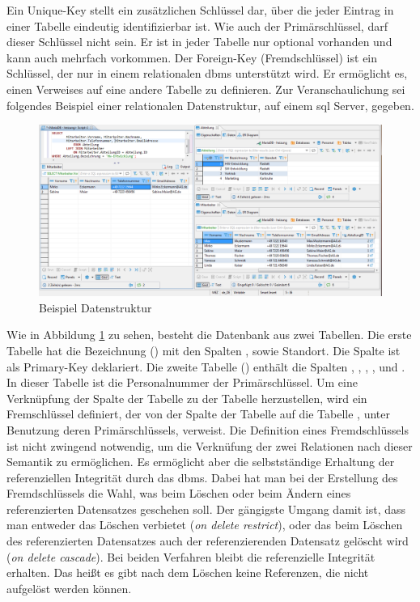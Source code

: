 Ein Unique-Key stellt ein zusätzlichen Schlüssel dar, über die jeder Eintrag in einer Tabelle eindeutig identifizierbar ist.
Wie auch der Primärschlüssel, darf dieser Schlüssel nicht  sein.
Er ist in jeder Tabelle nur optional vorhanden und kann auch mehrfach vorkommen.
Der Foreign-Key (Fremdschlüssel) ist ein Schlüssel, der nur in einem relationalen \ac{dbms} unterstützt wird.
Er ermöglicht es, einen Verweises auf eine andere Tabelle zu definieren.
Zur Veranschaulichung sei folgendes Beispiel einer relationalen Datenstruktur,
auf einem \ac{sql} Server, gegeben.
\begin{figure}[hbt]
  \centering
  \includegraphics[width=\textwidth]{content/hauptteil/theoretischeGrundlagen/rec/exampleSQL.png}
\caption{Beispiel Datenstruktur}
 \label{fig:exampleSQLStructure}%
\end{figure}
Wie in Abbildung \ref{fig:exampleSQLStructure} zu sehen, besteht die Datenbank  aus zwei Tabellen.
Die erste Tabelle hat die Bezeichnung () mit den Spalten ,  sowie Standort.
Die Spalte  ist als Primary-Key deklariert.
Die zweite Tabelle () enthält die Spalten 
, , , ,  und .
In dieser Tabelle ist die Personalnummer der Primärschlüssel.
Um eine Verknüpfung der Spalte  der Tabelle  zu der Tabelle  herzustellen, 
wird ein Fremschlüssel definiert, der von der Spalte  der Tabelle  auf die Tabelle , 
unter Benutzung deren Primärschlüssels, verweist.
Die Definition eines Fremdschlüssels ist nicht zwingend notwendig, um die Verknüfung der zwei Relationen nach dieser Semantik zu ermöglichen.
Es ermöglicht aber die selbstständige Erhaltung der referenziellen In­te­g­ri­tät durch das \ac{dbms}. 
Dabei hat man bei der Erstellung des Fremdschlüssels die Wahl, was beim Löschen oder beim Ändern eines referenzierten Datensatzes geschehen soll.
Der gängigste Umgang damit ist, dass man entweder das Löschen verbietet (\emph{on delete restrict}),
oder das beim Löschen des referenzierten Datensatzes auch der referenzierenden Datensatz gelöscht wird (\emph{on delete cascade}).
Bei beiden Verfahren bleibt die referenzielle In­te­g­ri­tät erhalten.
Das heißt es gibt nach dem Löschen keine Referenzen, die nicht aufgelöst werden können.


